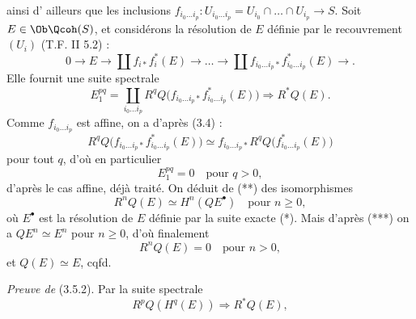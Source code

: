 ainsi d'%
ailleurs que les inclusions $f_{i_0\ldots i_p}:U_{i_0\ldots i_p}=U_{i_0}\cap\ldots\cap U_{i_p}\longrightarrow S$. Soit $E\in\Ob\Qcoh(S)$, et considérons la résolution de $E$ définie par le recouvrement $(U_i)$ (T.F. II 5.2) :
\begin{equation}\tag{*}
 0\longrightarrow E\longrightarrow \coprod f_{i*}f_i^*(E)\longrightarrow\ldots\longrightarrow
 \coprod f_{i_0\ldots i_p*}f_{i_0\ldots i_p}^*(E)\longrightarrow .
\end{equation}
Elle fournit une suite spectrale
\begin{equation}\tag{**}
 E_1^{pq}=\coprod_{i_0\ldots i_p}R^qQ\bigl(f_{i_0\ldots i_p*}f_{i_0\ldots i_p}^*(E)\bigr)
 \Longrightarrow R^{*}Q(E).
\end{equation}
Comme $f_{i_0\ldots i_p}$ est affine, on a d'après (3.4) :
\begin{equation}\tag{***}
 R^qQ\bigl(f_{i_0\ldots i_p*}f_{i_0\ldots i_p}^*(E)\bigr)
 \simeq f_{i_0\ldots i_p*}R^qQ\bigl(f_{i_0\ldots i_p}^*(E)\bigr)
\end{equation}
pour tout $q$, d'où en particulier
\[
 E_1^{pq}=0\quad\text{pour }q>0,
\]
d'après le cas affine, déjà traité. On déduit de (**) des isomorphismes
\[
 R^nQ(E)\simeq H^n(QE^\bullet)\quad\text{pour }n\geq0,
\]
où $E^\bullet$ est la résolution de $E$ définie par la suite exacte (*). Mais d'après (***) on a $QE^n\simeq E^n$ pour $n\geq0$, d'où finalement
\[
 R^nQ(E)=0\quad\text{pour }n>0,
\]
et $Q(E)\simeq E$, cqfd.

\emph{Preuve de} (3.5.2). Par la suite spectrale
\[
 R^pQ(H^q(E))\Longrightarrow R^{*}Q(E),
\]
